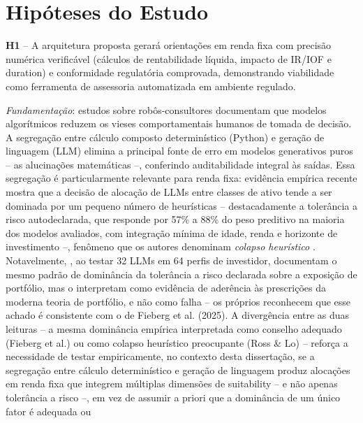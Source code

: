 \chapter{Hip\'oteses do Estudo}
\label{cap:hipoteses}

\textbf{H1} -- A arquitetura proposta gerar\'a orienta\c{c}\~oes em renda
fixa com precis\~ao num\'erica verific\'avel (c\'alculos de rentabilidade
l\'iquida, impacto de IR/IOF e duration) e conformidade regulat\'oria
comprovada, demonstrando viabilidade como ferramenta de assessoria
automatizada em ambiente regulado.

\textit{Fundamenta\c{c}\~ao}: estudos sobre rob\^os-consultores
\autocite{dacunto2019} documentam que modelos algor\'itmicos reduzem os
vieses comportamentais humanos de tomada de decis\~ao. A segrega\c{c}\~ao
entre c\'alculo composto determin\'istico (Python) e gera\c{c}\~ao de
linguagem (LLM) elimina a principal fonte de erro em modelos generativos
puros -- as alucina\c{c}\~oes matem\'aticas --, conferindo auditabilidade
integral \`as sa\'idas. Essa segrega\c{c}\~ao \'e particularmente
relevante para renda fixa: evid\^encia emp\'irica recente mostra que a
decis\~ao de aloca\c{c}\~ao de LLMs entre classes de ativo tende a ser
dominada por um pequeno n\'umero de heur\'isticas -- destacadamente a
toler\^ancia a risco autodeclarada, que responde por 57\% a 88\% do
peso preditivo na maioria dos modelos avaliados, com integra\c{c}\~ao
m\'inima de idade, renda e horizonte de investimento --, fen\^omeno que
os autores denominam \textit{colapso heur\'istico}
\autocite{ross2026}. Notavelmente, \textcite{fieberg2025}, ao testar 32
LLMs em 64 perfis de investidor, documentam o mesmo padr\~ao de
domin\^ancia da toler\^ancia a risco declarada sobre a exposi\c{c}\~ao
de portf\'olio, mas o interpretam como evid\^encia de ader\^encia \`as
prescri\c{c}\~oes da moderna teoria de portf\'olio, e n\~ao como falha
-- os pr\'oprios \textcite{ross2026} reconhecem que esse achado \'e
consistente com o de Fieberg et al. (2025). A diverg\^encia entre as
duas leituras -- a mesma domin\^ancia emp\'irica interpretada como
conselho adequado (Fieberg et al.) ou como colapso heur\'istico
preocupante (Ross \& Lo) -- refor\c{c}a a necessidade de testar
empiricamente, no contexto desta disserta\c{c}\~ao, se a segrega\c{c}\~ao
entre c\'alculo determin\'istico e gera\c{c}\~ao de linguagem produz
aloca\c{c}\~oes em renda fixa que integrem m\'ultiplas dimens\~oes de
suitability -- e n\~ao apenas toler\^ancia a risco --, em vez de assumir
a priori que a domin\^ancia de um \'unico fator \'e adequada ou
